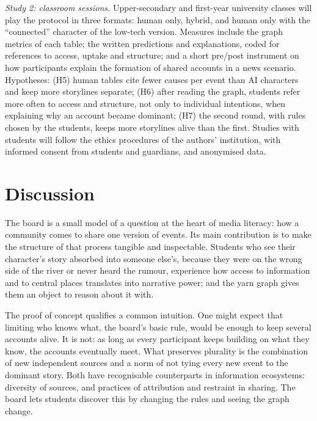 \documentclass[12pt]{article}
\begin{document}
\emph{Study 2: classroom sessions.} Upper-secondary and first-year university
classes will play the protocol in three formats: human only, hybrid, and
human only with the \enquote{connected} character of the low-tech version.
Measures include the graph metrics of each table; the written predictions
and explanations, coded for references to access, uptake and structure; and a
short pre/post instrument on how participants explain the formation of shared
accounts in a news scenario. Hypotheses: (H5) human tables cite fewer causes
per event than AI characters and keep more storylines separate; (H6) after
reading the graph, students refer more often to access and structure, not
only to individual intentions, when explaining why an account became
dominant; (H7) the second round, with rules chosen by the students, keeps more
storylines alive than the first. Studies with students will follow the
ethics procedures of the authors' institution, with informed consent from
students and guardians, and anonymised data.

\section{Discussion}

The board is a small model of a question at the heart of media literacy:
how a community comes to share one version of events. Its main contribution
is to make the structure of that process tangible and inspectable. Students
who see their character's story absorbed into someone else's, because they
were on the wrong side of the river or never heard the rumour, experience
how access to information and to central places translates into narrative
power; and the yarn graph gives them an object to reason about it with.

The proof of concept qualifies a common intuition. One might expect that
limiting who knows what, the board's basic rule, would be enough to keep
several accounts alive. It is not: as long as every participant keeps
building on what they know, the accounts eventually meet. What preserves
plurality is the combination of new independent sources and a norm of not
tying every new event to the dominant story. Both have recognisable
counterparts in information ecosystems: diversity of sources, and practices
of attribution and restraint in sharing. The board lets students discover
this by changing the rules and seeing the graph change.
\end{document}
